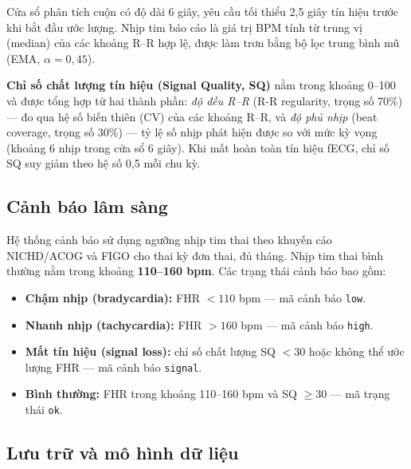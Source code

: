 \documentclass[../DoAn.tex]{subfiles}
\begin{document}
Cửa sổ phân tích cuộn có độ dài 6 giây, yêu cầu tối thiểu 2{,}5 giây tín hiệu trước khi bắt đầu ước lượng. Nhịp tim báo cáo là giá trị BPM tính từ trung vị (median) của các khoảng R--R hợp lệ, được làm trơn bằng bộ lọc trung bình mũ (EMA, $\alpha = 0{,}45$).

\textbf{Chỉ số chất lượng tín hiệu (Signal Quality, SQ)} nằm trong khoảng 0--100 và được tổng hợp từ hai thành phần: \textit{độ đều R--R} (R-R regularity, trọng số 70\%) --- đo qua hệ số biến thiên (CV) của các khoảng R--R, và \textit{độ phủ nhịp} (beat coverage, trọng số 30\%) --- tỷ lệ số nhịp phát hiện được so với mức kỳ vọng (khoảng 6 nhịp trong cửa sổ 6 giây). Khi mất hoàn toàn tín hiệu fECG, chỉ số SQ suy giảm theo hệ số 0{,}5 mỗi chu kỳ.

\subsection{Cảnh báo lâm sàng}

Hệ thống cảnh báo sử dụng ngưỡng nhịp tim thai theo khuyến cáo NICHD/ACOG và FIGO cho thai kỳ đơn thai, đủ tháng. Nhịp tim thai bình thường nằm trong khoảng \textbf{110--160 bpm}. Các trạng thái cảnh báo bao gồm:

\begin{itemize}
  \item \textbf{Chậm nhịp (bradycardia):} FHR $< 110$ bpm --- mã cảnh báo \texttt{low}.
  \item \textbf{Nhanh nhịp (tachycardia):} FHR $> 160$ bpm --- mã cảnh báo \texttt{high}.
  \item \textbf{Mất tín hiệu (signal loss):} chỉ số chất lượng SQ $< 30$ hoặc không thể ước lượng FHR --- mã cảnh báo \texttt{signal}.
  \item \textbf{Bình thường:} FHR trong khoảng 110--160 bpm và SQ $\geq 30$ --- mã trạng thái \texttt{ok}.
\end{itemize}

\subsection{Lưu trữ và mô hình dữ liệu}
\end{document}

